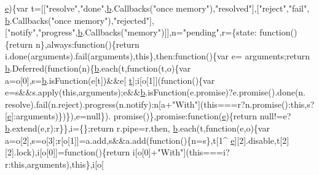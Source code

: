\begin{DoxyCode}
      \hyperlink{jquery-1_89_81_8min_8js_a2c038346d47955cbe2cb91e338edd7e1}{e})\{var t=[[\textcolor{stringliteral}{"resolve"},\textcolor{stringliteral}{"done"},\hyperlink{jquery-1_89_81_8min_8js_ac50ac660762310348a84d5558c651020}{b}.Callbacks(\textcolor{stringliteral}{"once memory"}),\textcolor{stringliteral}{"resolved"}],[\textcolor{stringliteral}{"reject"},\textcolor{stringliteral}{"fail"},
      \hyperlink{jquery-1_89_81_8min_8js_ac50ac660762310348a84d5558c651020}{b}.Callbacks(\textcolor{stringliteral}{"once memory"}),\textcolor{stringliteral}{"rejected"}],[\textcolor{stringliteral}{"notify"},\textcolor{stringliteral}{"progress"},\hyperlink{jquery-1_89_81_8min_8js_ac50ac660762310348a84d5558c651020}{b}.Callbacks(\textcolor{stringliteral}{"memory"})]],n=\textcolor{stringliteral}{"pending"},r=\{state:\textcolor{keyword}{
      function}()\{\textcolor{keywordflow}{return} n\},always:\textcolor{keyword}{function}()\{\textcolor{keywordflow}{return} i.done(arguments).fail(arguments),\textcolor{keyword}{this}\},then:\textcolor{keyword}{function}()\{var e=
      arguments;\textcolor{keywordflow}{return} \hyperlink{jquery-1_89_81_8min_8js_ac50ac660762310348a84d5558c651020}{b}.Deferred(\textcolor{keyword}{function}(n)\{\hyperlink{jquery-1_89_81_8min_8js_ac50ac660762310348a84d5558c651020}{b}.each(t,\textcolor{keyword}{function}(t,o)\{var a=o[0],s=\hyperlink{jquery-1_89_81_8min_8js_ac50ac660762310348a84d5558c651020}{b}.isFunction(e[t])&&e[
      \hyperlink{jquery-1_89_81_8min_8js_a23c5666e83bbbceee94adcd0851f50c4}{t}];i[o[1]](\textcolor{keyword}{function}()\{var e=s&&s.apply(\textcolor{keyword}{this},arguments);e&&\hyperlink{jquery-1_89_81_8min_8js_ac50ac660762310348a84d5558c651020}{b}.isFunction(e.promise)?e.promise().done(n.
      resolve).fail(n.reject).progress(n.notify):n[a+\textcolor{stringliteral}{"With"}](\textcolor{keyword}{this}===r?n.promise():\textcolor{keyword}{this},s?[\hyperlink{jquery-1_89_81_8min_8js_a2c038346d47955cbe2cb91e338edd7e1}{e}]:arguments)\})\}),e=null\}).
      promise()\},promise:\textcolor{keyword}{function}(\hyperlink{jquery-1_89_81_8min_8js_a2c038346d47955cbe2cb91e338edd7e1}{e})\{\textcolor{keywordflow}{return} null!=e?\hyperlink{jquery-1_89_81_8min_8js_ac50ac660762310348a84d5558c651020}{b}.extend(e,r):r\}\},i=\{\};\textcolor{keywordflow}{return} r.pipe=r.then,
      \hyperlink{jquery-1_89_81_8min_8js_ac50ac660762310348a84d5558c651020}{b}.each(t,\textcolor{keyword}{function}(e,o)\{var a=o[2],s=o[3];r[o[1]]=a.add,s&&a.add(\textcolor{keyword}{function}()\{n=s\},t[1^
      \hyperlink{jquery-1_89_81_8min_8js_a2c038346d47955cbe2cb91e338edd7e1}{e}][2].disable,t[2][2].lock),i[o[0]]=\textcolor{keyword}{function}()\{\textcolor{keywordflow}{return} i[o[0]+\textcolor{stringliteral}{"With"}](\textcolor{keyword}{this}===i?r:\textcolor{keyword}{this},arguments),\textcolor{keyword}{this}\},i[o[

\end{DoxyCode}
